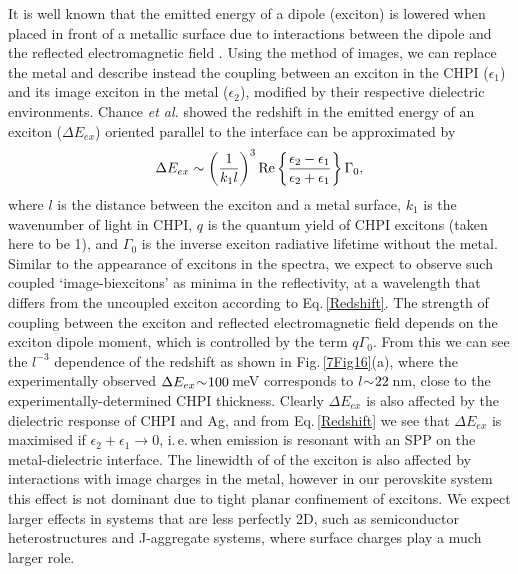 It is well known that the emitted energy of a dipole (exciton) is lowered when placed in front of a metallic surface due to interactions between the dipole and the reflected electromagnetic field \cite{Morawitz1969, Morawitz1974, Chance1974, Chance1975, Chance1975a, Ford1984}. Using the method of images, we can replace the metal and describe instead the coupling between an exciton in the CHPI ($\epsilon_1$) and its image exciton in the metal ($\epsilon_2$), modified by their respective dielectric environments. Chance \textit{et al.} \cite{Chance1975} showed the redshift in the emitted energy of an exciton ($\Delta E_{ex}$) oriented parallel to the interface can be approximated by
\begin{equation}
\centering
\Delta E_{ex} \sim \left( \frac{1}{k_1 l} \right) ^3 \text{Re} \left\{ \frac{\epsilon_2 - \epsilon_1}{\epsilon_2 + \epsilon_1} \right\} \Gamma_0 ,
\label{Redshift}
\end{equation}
where $l$ is the distance between the exciton and a metal surface, $k_1$ is the wavenumber of light in CHPI, $q$ is the quantum yield of CHPI excitons (taken here to be 1), and $\Gamma_0$ is the inverse exciton radiative lifetime without the metal. Similar to the appearance of excitons in the spectra, we expect to observe such coupled `image-biexcitons' as minima in the reflectivity, at a wavelength that differs from the uncoupled exciton according to Eq.\,\ref{Redshift}. The strength of coupling between the exciton and reflected electromagnetic field depends on the exciton dipole moment, which is controlled by the term $q \Gamma_0$. From this we can see the $l^{-3}$ dependence of the redshift as shown in Fig.\,\ref{7Fig16}(a), where the experimentally observed $\Delta E_{ex} \negmedspace \sim \negmedspace 100$\,meV corresponds to $l \negmedspace \sim \negmedspace 22$\,nm, close to the experimentally-determined CHPI thickness. Clearly $\Delta E_{ex}$ is also affected by the dielectric response of CHPI and Ag, and from Eq.\,\ref{Redshift} we see that $\Delta E_{ex}$ is maximised if $\epsilon_2 + \epsilon_1 \rightarrow 0$, i.\,e.\,when emission is resonant with an SPP on the metal-dielectric interface. The linewidth of of the exciton is also affected by interactions with image charges in the metal, however in our perovskite system this effect is not dominant due to tight planar confinement of excitons. We expect larger effects in systems that are less perfectly 2D, such as semiconductor heterostructures and J-aggregate systems, where surface charges play a much larger role.

